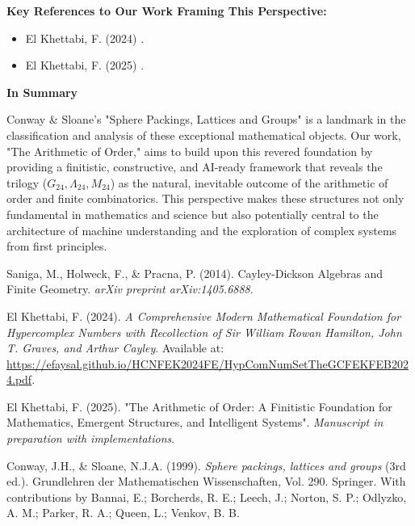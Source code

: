 \documentclass[11pt,a4paper]{article}
\begin{document}
\textbf{Key References to Our Work Framing This Perspective:}
\begin{itemize}
    \item El Khettabi, F. (2024) \cite{ElKhettabi2024HCN}.
    \item El Khettabi, F. (2025) \cite{ElKhettabi2025AO}.
\end{itemize}

\textbf{In Summary}

Conway \& Sloane’s "Sphere Packings, Lattices and Groups" is a landmark in the classification and analysis of these exceptional mathematical objects. Our work, "The Arithmetic of Order," aims to build upon this revered foundation by providing a finitistic, constructive, and AI-ready framework that reveals the trilogy ($G_{24}, \Lambda_{24}, M_{24}$) as the natural, inevitable outcome of the arithmetic of order and finite combinatorics. This perspective makes these structures not only fundamental in mathematics and science but also potentially central to the architecture of machine understanding and the exploration of complex systems from first principles.

\begin{thebibliography}{9}

Saniga, M., Holweck, F., \& Pracna, P. (2014). Cayley-Dickson Algebras and Finite Geometry. \textit{arXiv preprint arXiv:1405.6888}.

El Khettabi, F. (2024). \textit{A Comprehensive Modern Mathematical Foundation for Hypercomplex Numbers with Recollection of Sir William Rowan Hamilton, John T. Graves, and Arthur Cayley}. Available at: \url{https://efaysal.github.io/HCNFEK2024FE/HypComNumSetTheGCFEKFEB2024.pdf}.

El Khettabi, F. (2025). "The Arithmetic of Order: A Finitistic Foundation for Mathematics, Emergent Structures, and Intelligent Systems". \textit{Manuscript in preparation with implementations}.

Conway, J.H., \& Sloane, N.J.A. (1999). \textit{Sphere packings, lattices and groups} (3rd ed.). Grundlehren der Mathematischen Wissenschaften, Vol. 290. Springer. With contributions by Bannai, E.; Borcherds, R. E.; Leech, J.; Norton, S. P.; Odlyzko, A. M.; Parker, R. A.; Queen, L.; Venkov, B. B.


\end{thebibliography}
\end{document}
